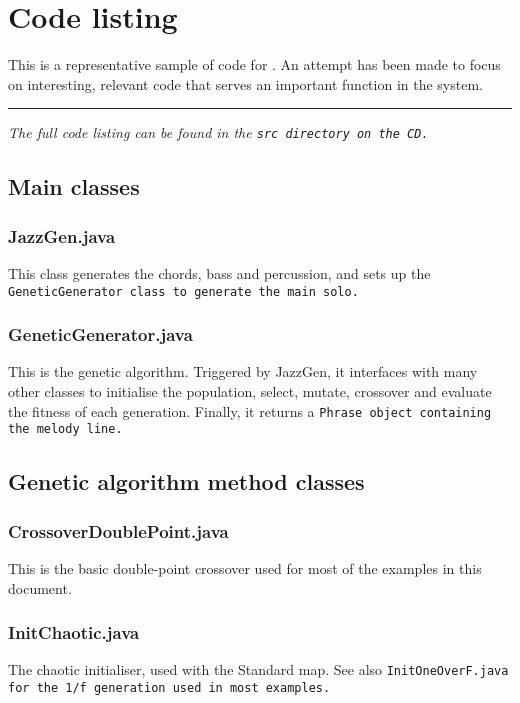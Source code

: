 \chapter{Code listing}

This is a representative sample of code for \jg. An attempt has been made to focus on interesting, relevant
code that serves an important function in the system.\begin{center}\rule[0.1cm]{0.6\textwidth}{0.5pt}\end{center}

\emph{The full code listing can be found in the \tt{src} directory on the CD.} 

\section{Main classes}
\subsection*{JazzGen.java}
This class generates the chords, bass and percussion, and sets up the \tt{GeneticGenerator} class to generate the main solo.


\subsection*{GeneticGenerator.java}
This is the genetic algorithm. Triggered by JazzGen, it interfaces with many other classes to initialise the population,
select, mutate, crossover and evaluate the fitness of each generation. Finally, it returns a \tt{Phrase} object containing
the melody line.


\section{Genetic algorithm method classes}
\subsection*{CrossoverDoublePoint.java}
This is the basic double-point crossover used for most of the examples in this document.


\subsection*{InitChaotic.java}
The chaotic initialiser, used with the Standard map. See also \tt{InitOneOverF.java} for the 1/f generation
used in most examples.


